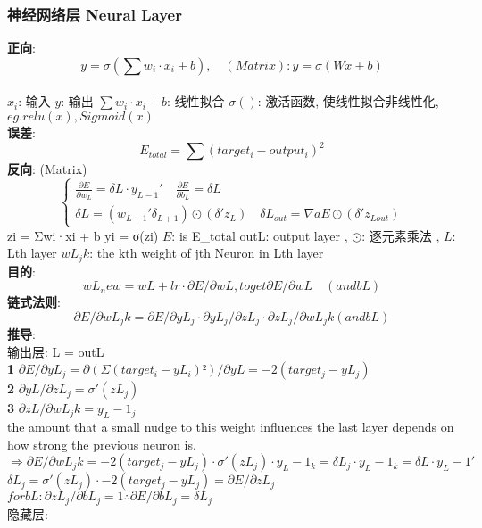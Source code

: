 \documentclass{article}
\begin{document}
\subsubsection{神经网络层 Neural Layer}
\textbf{正向}: 
$$ y = \sigma( \sum w_i·x_i + b ),\quad (Matrix): y = \sigma(W x + b)$$\\
$x_i$: 输入 \quad $y$: 输出 \quad $\sum w_i·x_i + b$: 线性拟合 \quad $\sigma()$: 激活函数, 使线性拟合非线性化, $eg. relu(x), Sigmoid(x)$\\
\textbf{误差}: 
$$E_{total} = \sum (target_i - output_i)^2$$
\textbf{反向}: (Matrix)\\
\begin{displaymath}
    \left\{ \begin{array}{ll}
    \frac{\partial E}{\partial w_L} = \delta L·y_{L-1}' \quad \frac{\partial E}{\partial b_L} = \delta L  \\
    \delta L = (w_{L+1}'\delta_{L+1}) \odot (\delta'z_L) \quad \delta L_{out} = \nabla aE \odot (\delta'z_{Lout})
    \end{array} \right.
\end{displaymath}
zi = Σwi·xi + b \quad yi = σ(zi) \quad $E$: is E_total	outL: output layer \quad , \quad $\odot$: 逐元素乘法 \quad , \quad $L$: Lth layer \quad $wL_jk$: the kth weight of jth Neuron in Lth layer\\
\textbf{目的}: 
$$wL_new = wL + lr·\partial E/\partial wL, to get \partial E/\partial wL \quad (and bL)$$
\textbf{链式法则}:
$$\partial E/\partial wL_jk = \partial E/\partial yL_j·\partial yL_j/\partial zL_j·\partial zL_j/\partial wL_jk	(and bL)$$
\textbf{推导}:\\
输出层: L = outL\\
\textbf{1} $\partial E/\partial yL_j = \partial (Σ(target_i - yL_i)²)/\partial yL = -2(target_j - yL_j)$\\
\textbf{2} $\partial yL/\partial zL_j = σ'(zL_j)$\\
\textbf{3} $\partial zL/\partial wL_jk = y_L-1_j$ \\
the amount that a small nudge to this weight influences the last layer depends on how strong the previous neuron is.\\
$$ \Rightarrow \partial E/\partial wL_jk = -2(target_j - yL_j)·σ'(zL_j)·y_L-1_k = δL_j·y_L-1_k = δL·y_L-1'$$
$δL_j = σ'(zL_j)·-2(target_j - yL_j) = \partial E/\partial zL_j$\\
$for bL: \partial zL_j/\partial bL_j = 1		∴\partial E/\partial bL_j = δL_j$\\
隐藏层:\\
\end{document}
